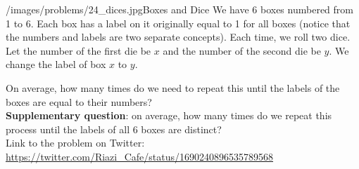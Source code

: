 \begin{problem}{/images/problems/24_dices.jpg}{Boxes and Dice}
	We have 6 boxes numbered from 1 to 6. Each box has a label on it originally equal to 1 for all boxes (notice that the numbers and labels are two separate concepts). Each time, we roll two dice. Let the number of the first die be $x$ and the number of the second die be $y$. We change the label of box $x$ to $y$.

On average, how many times do we need to repeat this until the labels of the boxes are equal to their numbers?\\[0.2cm]

\textbf{Supplementary question}: on average, how many times do we repeat this process until the labels of all 6 boxes are distinct?\\[0.2cm]

Link to the problem on Twitter:  \url{https://twitter.com/Riazi_Cafe/status/1690240896535789568}
\end{problem}
